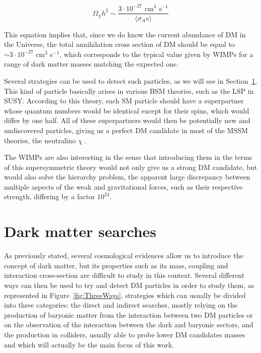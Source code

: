\documentclass[a4paper, 10pt, openright]{report}
\begin{document}
\begin{equation}
\label{eq:Annihilation}
\Omega_\chi h^2 \sim \frac{3 \cdot 10^{-27} \text{ cm}^3 \text{ s}^{-1}}{\langle \sigma_A v \rangle}
\end{equation}

This equation implies that, since we do know the current abundance of \ac{DM} in the Universe, the total annihilation cross section of \ac{DM} should be equal to $\sim 3 \cdot 10^{-27} $ cm$^3 $ s$^{-1}$, which corresponds to the typical value given by \acp{WIMP} for a range of dark matter masses matching the expected one.

Several strategies can be used to detect such particles, as we will see in Section~\ref{section:DMSearches}. This kind of particle basically arises in various \ac{BSM} theories, such as the \ac{LSP} in SUSY. According to this theory, each \ac{SM} particle should have a superpartner whose quantum numbers would be identical except for their spins, which would differ by one half. All of these superpartners would then be potentially new and undiscovered particles, giving us a perfect \ac{DM} candidate in most of the \ac{MSSM} theories, the neutralino $\chi$ \cite{MSSM}.

The \acp{WIMP} are also interesting in the sense that introducing them in the terms of this supersymmetric theory would not only give us a strong \ac{DM} candidate, but would also solve the hierarchy problem, the apparent large discrepancy between multiple aspects of the weak and gravitational forces, such as their respective strength, differing by a factor $10^{24}$.

\section{Dark matter searches} \label{section:DMSearches}

As previously stated, several cosmological evidences allow us to introduce the concept of dark matter, but its properties such as its mass, coupling and interaction cross-section are difficult to study in this context. Several different ways can then be used to try and detect \ac{DM} particles in order to study them, as represented in Figure~\ref{fig:ThreeWays}, strategies which can usually be divided into three categories: the direct and indirect searches, mostly relying on the production of baryonic matter from the interaction between two \ac{DM} particles or on the observation of the interaction between the dark and baryonic sectors, and the production in colliders, usually able to probe lower \ac{DM} candidates masses and which will actually be the main focus of this work. 
\end{document}
